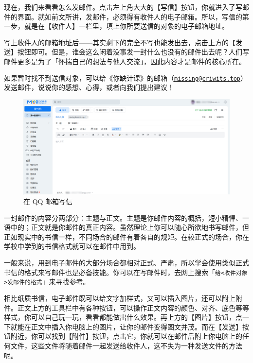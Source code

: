 现在，我们来看看怎么发邮件。点击左上角大大的【写信】按钮，你就进入了写邮件的界面。就如前文所讲，发邮件，必须得有收件人的电子邮箱。所以，写信的第一步，就是在【收件人】一栏里，填上你所要送信的对象的电子邮箱地址。

写上收件人的邮箱地址后——其实剩下的完全不写也能发出去，点击上方的【发送】按钮即可。但是，谁会这么闲着没事发一封什么也没有的邮件出去呢？人们写邮件更多是为了「怀揣自己的想法与他人交流」，因此内容才是邮件的核心所在。

\begin{note}
  如果暂时找不到送信对象，可以给《你缺计课》的邮箱（\href{mailto:missing@criwits.top}{\texttt{missing@criwits.top}}）发送邮件，说说你的感想、心得，或者向我们提出建议！
\end{note}

\begin{figure}[htb!]
  \centering
  \includegraphics[width=.8\textwidth]{assets/software/QQ_Mail_Writing.png}
  \caption{在 QQ 邮箱写信}
  \label{fig:QQ_Mail_Writing}
\end{figure}

一封邮件的内容分两部分：主题与正文。主题是你邮件内容的概括，短小精悍、一语中的；正文就是你邮件的真正内容。虽然理论上你可以随心所欲地书写邮件，但正如现实中的书信一样，不同场合的邮件有着各自的规矩。在较正式的场合，你在学校中学到的书信格式就可以在邮件中用到。

\begin{note}
  一般来说，用到电子邮件的大部分场合都相对正式、严肃，所以学会使用类似正式书信的格式来写邮件也是必备技能。你可以在写邮件时，去网上搜索「\texttt{给<收件对象>发邮件的格式}」来寻找参考。
\end{note}

相比纸质书信，电子邮件既可以给文字加样式，又可以插入图片，还可以附上附件。正文上方的工具栏中有各种按钮，可以操作正文内容的颜色、对齐、底色等等样式，你可以自己玩一玩，看看都能做出什么效果。再上方的【图片】按钮，点一下就能在正文中插入你电脑上的图片，让你的邮件变得图文并茂。而在【发送】按钮附近，你可以找到【附件】按钮，点击它，你就可以在邮件后附上你电脑上的任何文件，这些文件将随着邮件一起发送给收件人，这不失为一种发送文件的方法呢。

